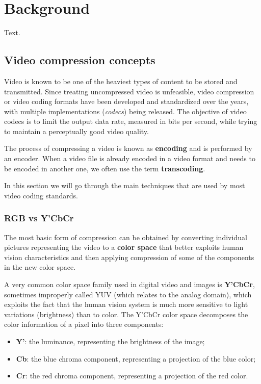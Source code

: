 \chapter{Background}
\label{cha:bg}

Text.


\section{Video compression concepts}
\label{sec:bg/compression}

Video is known to be one of the heaviest types of content to be stored and transmitted. Since treating uncompressed video is unfeasible, video compression or video coding formats have been developed and standardized over the years, with multiple implementations (\textit{codecs}) being released. The objective of video codecs is to limit the output data rate, measured in bits per second, while trying to maintain a perceptually good video quality.

The process of compressing a video is known as \textbf{encoding} and is performed by an encoder. When a video file is already encoded in a video format and needs to be encoded in another one, we often use the term \textbf{transcoding}.

In this section we will go through the main techniques that are used by most video coding standards.

\subsection{RGB vs Y'CbCr}
\label{sec:bg/compression/ycbcr}

The most basic form of compression can be obtained by converting individual pictures representing the video to a \textbf{color space} that better exploits human vision characteristics and then applying compression of some of the components in the new color space.

A very common color space family used in digital video and images is \textbf{Y'CbCr}, sometimes improperly called YUV (which relates to the analog domain), which exploits the fact that the human vision system is much more sensitive to light variations (brightness) than to color. The Y'CbCr color space decomposes the color information of a pixel into three components:

\begin{itemize}
    \item \textbf{Y'}: the luminance, representing the brightness of the image;
    \item \textbf{Cb}: the blue chroma component, representing a projection of the blue color;
    \item \textbf{Cr}: the red chroma component, representing a projection of the red color.
\end{itemize}

